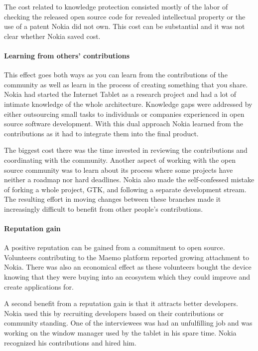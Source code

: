 \documentclass[a4paper]{scrartcl}
\begin{document}
The cost related to knowledge protection consisted mostly of the labor of checking the released open source code for revealed intellectual property or the use of a patent Nokia did not own.
This cost can be substantial and it was not clear whether Nokia saved cost.

\paragraph{Learning from others' contributions}
This effect goes both ways as you can learn from the contributions of the community as well as learn in the process of creating something that you share. 
Nokia had started the Internet Tablet as a research project and had a lot of intimate knowledge of the whole architecture.
Knowledge gaps were addressed by either outsourcing small tasks to individuals or companies experienced in open source software development. 
With this dual approach Nokia learned from the contributions as it had to integrate them into the final product.  

The biggest cost there was the time invested in reviewing the contributions and coordinating with the community.
Another aspect of working with the open source community was to learn about its process where some projects have neither a roadmap nor hard deadlines.
Nokia also made the self-confessed mistake of forking a whole project, GTK, and following a separate development stream. 
The resulting effort in moving changes between these branches made it increasingly difficult to benefit from other people's contributions.

\paragraph{Reputation gain}
A positive reputation can be gained from a commitment to open source. 
Volunteers contributing to the Maemo platform reported growing attachment to Nokia.
There was also an economical effect as these volunteers bought the device knowing that they were buying into an ecosystem which they could improve and create applications for. 

A second benefit from a reputation gain is that it attracts better developers.
Nokia used this by recruiting developers based on their contributions or community standing. 
One of the interviewees was had an unfulfilling job and was working on the window manager used by the tablet in his spare time.
Nokia recognized his contributions and hired him.
\end{document}
